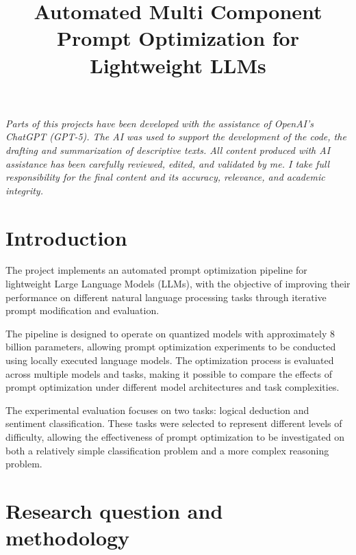\documentclass[pdflatex,sn-mathphys-num]{sn-jnl}%
\theoremstyle{thmstyleone}%
\theoremstyle{thmstyletwo}%
\theoremstyle{thmstylethree}%
\begin{document}
\title[Automated Multi Component Prompt Optimization for Lightweight LLMs]{Automated Multi Component Prompt Optimization for Lightweight LLMs}

\author{ }


\abstract{}


\maketitle

\textit{Parts of this projects have been developed with the assistance of OpenAI’s ChatGPT (GPT-5). The AI was used to support the development of the code, the drafting and summarization of descriptive texts. All content produced with AI assistance has been carefully reviewed, edited, and validated by me. I take full responsibility for the final content and its accuracy, relevance, and academic integrity.}
\clearpage

\section{Introduction}

The project implements an automated prompt optimization pipeline for
lightweight Large Language Models (LLMs), with the objective of improving
their performance on different natural language processing tasks through
iterative prompt modification and evaluation.

The pipeline is designed to operate on quantized models with approximately
8 billion parameters, allowing prompt optimization experiments to be
conducted using locally executed language models. The optimization process
is evaluated across multiple models and tasks, making it possible to
compare the effects of prompt optimization under different model
architectures and task complexities.

The experimental evaluation focuses on two tasks: logical deduction and
sentiment classification. These tasks were selected to represent different
levels of difficulty, allowing the effectiveness of prompt optimization to
be investigated on both a relatively simple classification problem and a
more complex reasoning problem.

\section{Research question and methodology}\label{sec:method}
\end{document}
